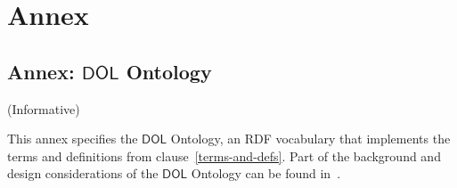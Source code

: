 \documentclass[10pt,fleqn,final]{scrreprt}
\makeatletter
\newcommand*\CommentAuthor{}
\renewcommand*\CommentAuthor{#1}}
\newcommand*\CommentDate{}
\renewcommand*\CommentDate{#1}}
\newcommand*\CommentId{}
\renewcommand*\CommentId{#1}}
\newcommand*\CommentType{}
\renewcommand*\CommentType{#1}}
\newcommand*{\SetCommentColorByType}[1]{%
\edef\localType{{#1}}%
\expandafter\ifstrequal\localType{q-aut}{\colorlet{CommentColor}{red}}{%
\expandafter\ifstrequal\localType{q-all}{\colorlet{CommentColor}{orange}}{%
\expandafter\ifstrequal\localType{todo}{\colorlet{CommentColor}{orange}}{%
\expandafter\ifstrequal\localType{fyi}{\colorlet{CommentColor}{lightgray}}{%
\colorlet{CommentColor}{yellow}}}}}}
\newcommand*{\SetCommentPrefixByType}[1]{%
\edef\localType{{#1}}%
\expandafter\@ifmtarg\localType{%
\edef\CommentPrefix{}%
}{%
\caseupper[q]{#1}%
\edef\CommentPrefix{\thestring: }%
}}
\newcommand*{\initComment}[1]{%
\setkeys{Comment}{#1}%
\SetCommentColorByType{\CommentType}%
\relax%
\SetCommentPrefixByType{\CommentType}%
\relax%
}
\newcommand*{\todonote}[2][]{%
\initComment{#1}%
\pdfcomment[author=\CommentAuthor,color=CommentColor,date=\CommentDate,id=\CommentId]{%
\CommentPrefix
#2}}
\renewcommand*{\todonote}[2][]{%
\initComment{#1}%
\ednote{\CommentPrefix #2}}
\newcommand*{\CL}{\ensuremath{\mathsf{CL}}\xspace}
\newcommand*{\DOL}{\ensuremath{\mathsf{DOL}}\xspace}
\newcommand{\clauserefname}{clause}
\newcommand{\cref}[1]{\clauserefname~\ref{#1}}
\newcommand{\informative}[0]{{\begin{center}{\Large{(Informative})}\end{center}} \bigskip}
\newcommand{\sclause}[1]{\section{#1}}
\newcommand{\infannex}[1]{ \chapter{Annex: #1}  \informative }
\newenvironment{definitions}[0]{\medskip }{}
\makeatother
\begin{document}
\begin{definitions}
%
%






\part*{Annex}

\appendix

\infannex{\DOL Ontology}
\label{a:dol-onto}



This annex specifies the \DOL Ontology, an RDF vocabulary that implements the terms and definitions from \cref{terms-and-defs}.
Part of the background and design considerations of the \DOL Ontology can be found in~\cite{LMK:LoLaModularOntologyLogLangTrans12}.


\end{definitions}
\end{document}

